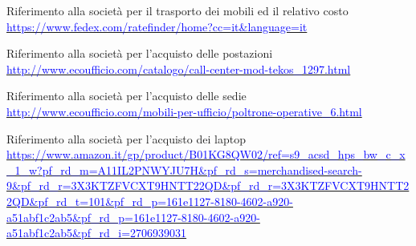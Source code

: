 \begin{thebibliography}{99}
 Riferimento alla società per il trasporto dei mobili ed il relativo costo\newline 
			\href{https://www.fedex.com/ratefinder/home?cc=it\&language=it
}{\textcolor{blue}{https://www.fedex.com/ratefinder/home?cc=it\&language=it}}

 Riferimento alla società per l'acquisto delle postazioni\newline 
			\href{http://www.ecoufficio.com/catalogo/call-center-mod-tekos\_1297.html
}{\textcolor{blue}{http://www.ecoufficio.com/catalogo/call-center-mod-tekos\_1297.html}}

 Riferimento alla società per l'acquisto delle sedie\newline 
			\href{http://www.ecoufficio.com/mobili-per-ufficio/poltrone-operative\_6.html
}{\textcolor{blue}{http://www.ecoufficio.com/mobili-per-ufficio/poltrone-operative\_6.html}}

 Riferimento alla società per l'acquisto dei laptop\newline 
			\href{https://www.amazon.it/gp/product/B01KG8QW02/ref=s9\_acsd\_hps\_bw\_c\_x\_1\_w?pf\_rd\_m=A11IL2PNWYJU7H\&pf\_rd\_s=merchandised-search-9\&pf\_rd\_r=3X3KTZFVCXT9HNTT22QD\&pf\_rd\_r=3X3KTZFVCXT9HNTT22QD\&pf\_rd\_t=101\&pf\_rd\_p=161e1127-8180-4602-a920-a51abf1c2ab5\&pf\_rd\_p=161e1127-8180-4602-a920-a51abf1c2ab5\&pf\_rd\_i=2706939031
}{\textcolor{blue}{https://www.amazon.it/gp/product/B01KG8QW02/ref=s9\_acsd\_hps\_bw\_c\_x\_1\_w?pf\_rd\_m=A11IL2PNWYJU7H\&pf\_rd\_s=merchandised-search-9\&pf\_rd\_r=3X3KTZFVCXT9HNTT22QD\&pf\_rd\_r=3X3KTZFVCXT9HNTT22QD\&pf\_rd\_t=101\&pf\_rd\_p=161e1127-8180-4602-a920-a51abf1c2ab5\&pf\_rd\_p=161e1127-8180-4602-a920-a51abf1c2ab5\&pf\_rd\_i=2706939031}}


		
\end{thebibliography}